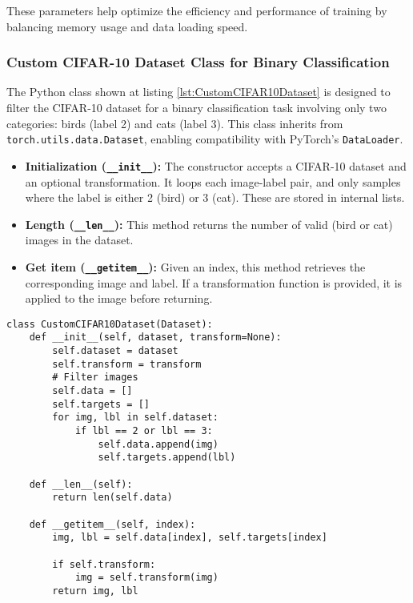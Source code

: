 These parameters help optimize the efficiency and performance of training by balancing memory usage and data loading speed.


\subsubsection{Custom CIFAR-10 Dataset Class for Binary Classification}

The Python class shown at listing \ref{lst:CustomCIFAR10Dataset} is designed to filter the CIFAR-10 dataset for a binary classification task involving only two categories: birds (label 2) and cats (label 3).
This class inherits from \texttt{torch.utils.data.Dataset}, enabling compatibility with PyTorch's \texttt{DataLoader}.
\begin{itemize}
    \item \textbf{Initialization (\texttt{\_\_init\_\_}):} The constructor accepts a CIFAR-10 dataset and an optional transformation. It loops each image-label pair, and only samples where the label is either 2 (bird) or 3 (cat). These are stored in internal lists.
    
    \item \textbf{Length (\texttt{\_\_len\_\_}):} This method returns the number of valid (bird or cat) images in the dataset.
    
    \item \textbf{Get item (\texttt{\_\_getitem\_\_}):} Given an index, this method retrieves the corresponding image and label. If a transformation function is provided, it is applied to the image before returning.
\end{itemize}
\begin{minipage}{\linewidth}
\begin{lstlisting}[caption=CustomCIFAR10Dataset, label={lst:CustomCIFAR10Dataset}]
class CustomCIFAR10Dataset(Dataset):
    def __init__(self, dataset, transform=None):
        self.dataset = dataset
        self.transform = transform
        # Filter images
        self.data = []
        self.targets = []
        for img, lbl in self.dataset:
            if lbl == 2 or lbl == 3:
                self.data.append(img)
                self.targets.append(lbl)

    def __len__(self):
        return len(self.data)

    def __getitem__(self, index):
        img, lbl = self.data[index], self.targets[index]

        if self.transform:
            img = self.transform(img)
        return img, lbl
\end{lstlisting}
\end{minipage}
